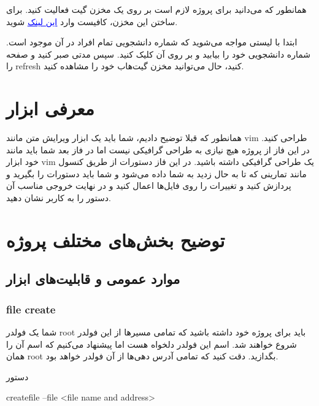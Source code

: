 \documentclass[]{article}
\begin{document}
همانطور که می‌دانید برای پروژه لازم است بر روی یک مخزن  گیت فعالیت کنید. برای ساختن این مخزن، کافیست وارد
 \href{https://classroom.github.com/a/LdTbBdiJ}{\textcolor{blue}{\underline{این لینک}}} 
 شوید.

ابتدا با لیستی مواجه می‌شوید که شماره دانشجویی تمام افراد در آن موجود است. شماره دانشجویی خود را بیابید و بر روی آن کلیک کنید. سپس مدتی صبر کنید و صفحه را refresh کنید، حال می‌توانید مخزن گیت‌هاب خود را مشاهده کنید.

\section*{{\titr معرفی ابزار}}
همانطور که قبلا توضیح دادیم، شما باید یک ابزار ویرایش متن مانند vim طراحی کنید. در این فاز از پروژه هیچ نیازی به طراحی گرافیکی نیست اما در فاز بعد شما باید مانند خود ابزار vim یک طراحی گرافیکی داشته باشید. در این فاز دستورات از طریق کنسول مانند تمارینی که تا به حال زدید به شما داده می‌شود و شما باید دستورات را بگیرید و پردازش کنید و تغییرات را روی فایل‌ها اعمال کنید و در نهایت خروجی مناسب آن دستور را به کاربر نشان دهید.


\newpage
\section*{{\titr توضیح بخش‌های مختلف پروژه}}



\subsection*{{\titr موارد عمومی و قابلیت‌های ابزار}}



\subsubsection*{{\titr file create}}

شما یک فولدر root باید برای پروژه خود داشته باشید که تمامی مسیرها از این فولدر شروع خواهند شد. اسم این فولدر دلخواه هست اما پیشنهاد می‌کنیم که اسم آن را همان root بگدازید. دقت کنید که تمامی آدرس دهی‌ها از آن فولدر خواهد بود.

\begin{mybox}[colback=yellow]{دستور}
	\begin{latin}	
		createfile --file <file name and address>
	\end{latin}
\end{mybox}
\end{document}
